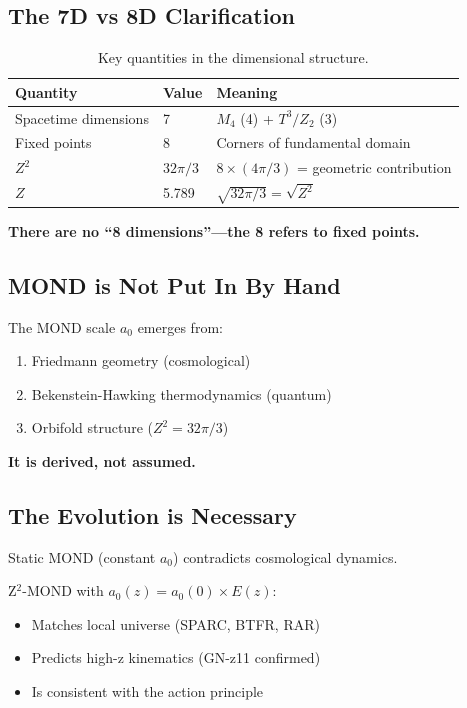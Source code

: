\documentclass[12pt,a4paper]{article}
\begin{document}
\subsection{The 7D vs 8D Clarification}

\begin{table}[h]
\centering
\begin{tabular}{@{}lll@{}}
\toprule
Quantity & Value & Meaning \\
\midrule
Spacetime dimensions & 7 & $M_4$ (4) + $T^3/Z_2$ (3) \\
Fixed points & 8 & Corners of fundamental domain \\
$Z^2$ & $32\pi/3$ & $8 \times (4\pi/3)$ = geometric contribution \\
$Z$ & 5.789 & $\sqrt{32\pi/3} = \sqrt{Z^2}$ \\
\bottomrule
\end{tabular}
\caption{Key quantities in the dimensional structure.}
\end{table}

\textbf{There are no ``8 dimensions''---the 8 refers to fixed points.}

\subsection{MOND is Not Put In By Hand}

The MOND scale $a_0$ emerges from:
\begin{enumerate}
\item Friedmann geometry (cosmological)
\item Bekenstein-Hawking thermodynamics (quantum)
\item Orbifold structure ($Z^2 = 32\pi/3$)
\end{enumerate}

\textbf{It is derived, not assumed.}

\subsection{The Evolution is Necessary}

Static MOND (constant $a_0$) contradicts cosmological dynamics.

Z$^2$-MOND with $a_0(z) = a_0(0) \times E(z)$:
\begin{itemize}
\item Matches local universe (SPARC, BTFR, RAR)
\item Predicts high-z kinematics (GN-z11 confirmed)
\item Is consistent with the action principle
\end{itemize}
\end{document}
